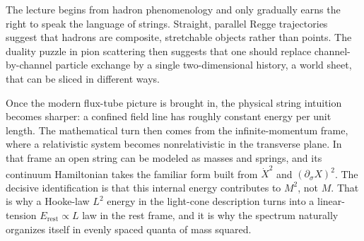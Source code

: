 The lecture begins from hadron phenomenology and only gradually earns the right to speak the language of strings. Straight, parallel Regge trajectories suggest that hadrons are composite, stretchable objects rather than points. The duality puzzle in pion scattering then suggests that one should replace channel-by-channel particle exchange by a single two-dimensional history, a world sheet, that can be sliced in different ways.

Once the modern flux-tube picture is brought in, the physical string intuition becomes sharper: a confined field line has roughly constant energy per unit length. The mathematical turn then comes from the infinite-momentum frame, where a relativistic system becomes nonrelativistic in the transverse plane. In that frame an open string can be modeled as masses and springs, and its continuum Hamiltonian takes the familiar form built from \(\dot X^2\) and \((\partial_\sigma X)^2\). The decisive identification is that this internal energy contributes to \(M^2\), not \(M\). That is why a Hooke-law \(L^2\) energy in the light-cone description turns into a linear-tension \(E_{\text{rest}}\propto L\) law in the rest frame, and it is why the spectrum naturally organizes itself in evenly spaced quanta of mass squared.